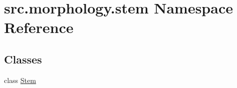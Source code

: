 \hypertarget{namespacesrc_1_1morphology_1_1stem}{\section{src.\+morphology.\+stem Namespace Reference}
\label{namespacesrc_1_1morphology_1_1stem}
}
\subsection*{Classes}
\begin{DoxyCompactItemize}
\item 
class \hyperlink{classsrc_1_1morphology_1_1stem_1_1_stem}{Stem}
\end{DoxyCompactItemize}

